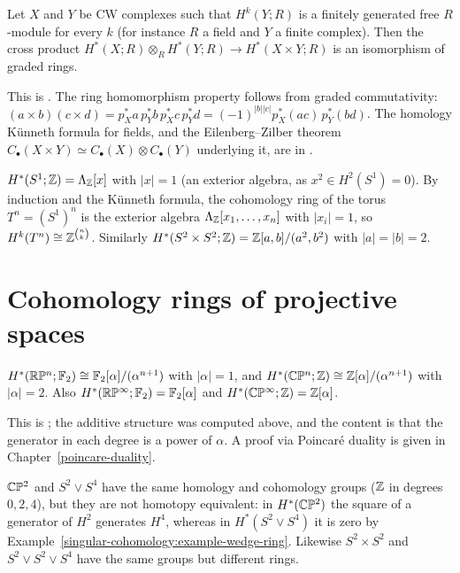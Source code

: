 \begin{theorem}\label{singular-cohomology:theorem-kunneth}
Let $X$ and $Y$ be CW complexes such that $H^k(Y; R)$ is a finitely generated free $R$-module for every $k$ (for instance $R$ a field and $Y$ a finite complex).
Then the cross product $H^*(X; R) \otimes_R H^*(Y; R) \to H^*(X \times Y; R)$ is an isomorphism of graded rings.
\end{theorem}

This is \cite[Theorem 3.15]{hatcher-at}. The ring homomorphism property follows from graded commutativity:
$(a \times b)(c \times d) = p_X^*a\, p_Y^*b\, p_X^*c\, p_Y^*d = (-1)^{|b||c|}p_X^*(ac)\,p_Y^*(bd)$. The homology K\"unneth formula for fields, and the
Eilenberg--Zilber theorem $C_\bullet(X \times Y) \simeq C_\bullet(X) \otimes C_\bullet(Y)$ underlying it, are in \cite[Section 3.B]{hatcher-at}.

\begin{example}\label{singular-cohomology:example-torus}
$H^*(S^1; \mathbb{Z}) = \Lambda_{\mathbb{Z}}[x]$ with $|x| = 1$ (an exterior algebra, as $x^2 \in H^2(S^1) = 0$). By induction and the K\"unneth formula, the cohomology ring of the torus
$T^n = (S^1)^n$ is the exterior algebra $\Lambda_{\mathbb{Z}}[x_1, \ldots, x_n]$ with $|x_i| = 1$, so $H^k(T^n) \cong \mathbb{Z}^{\binom{n}{k}}$. Similarly
$H^*(S^2 \times S^2; \mathbb{Z}) = \mathbb{Z}[a, b]/(a^2, b^2)$ with $|a| = |b| = 2$.
\end{example}

\section{Cohomology rings of projective spaces}\label{singular-cohomology:section-projective}

\begin{theorem}\label{singular-cohomology:theorem-projective-spaces}
$H^*(\mathbb{R}\mathbb{P}^n; \mathbb{F}_2) \cong \mathbb{F}_2[\alpha]/(\alpha^{n+1})$ with $|\alpha| = 1$, and $H^*(\mathbb{C}\mathbb{P}^n; \mathbb{Z}) \cong \mathbb{Z}[\alpha]/(\alpha^{n+1})$ with $|\alpha| = 2$. Also
$H^*(\mathbb{R}\mathbb{P}^\infty; \mathbb{F}_2) = \mathbb{F}_2[\alpha]$ and $H^*(\mathbb{C}\mathbb{P}^\infty; \mathbb{Z}) = \mathbb{Z}[\alpha]$.
\end{theorem}

This is \cite[Theorem 3.12]{hatcher-at}; the additive structure was computed above, and the content is that the generator in each degree is a power of $\alpha$. A
proof via Poincar\'e duality is given in Chapter~\ref{poincare-duality}.

\begin{example}\label{singular-cohomology:example-cp2-wedge}
$\mathbb{C}\mathbb{P}^2$ and $S^2 \vee S^4$ have the same homology and cohomology groups ($\mathbb{Z}$ in degrees $0, 2, 4$), but they are not homotopy equivalent: in $H^*(\mathbb{C}\mathbb{P}^2)$ the square of
a generator of $H^2$ generates $H^4$, whereas in $H^*(S^2 \vee S^4)$ it is zero by Example~\ref{singular-cohomology:example-wedge-ring}. Likewise $S^2 \times S^2$ and
$S^2 \vee S^2 \vee S^4$ have the same groups but different rings.
\end{example}

